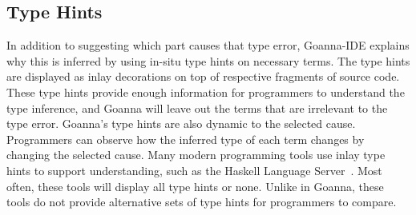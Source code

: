 \documentclass[pdflatex,lineno,sn-nature,Numbered]{sn-jnl}%
\begin{document}
    \subsection{Type Hints}\label{subset:type-hints}
    In addition to suggesting which part causes that type error, Goanna-IDE explains why this is inferred by using in-situ type hints on necessary terms. The type hints are displayed as inlay decorations on top of respective fragments of source code. These type hints provide enough information for programmers to understand the type inference, and Goanna will leave out the terms that are irrelevant to the type error. Goanna's type hints are also dynamic to the selected cause. Programmers can observe how the inferred type of each term changes by changing the selected cause. Many modern programming tools use inlay type hints to support understanding, such as the Haskell Language Server~\cite{HLS-Developers2023-ot}. Most often, these tools will display all type hints or none. Unlike in Goanna, these tools do not provide alternative sets of type hints for programmers to compare.
    
    
\end{document}
